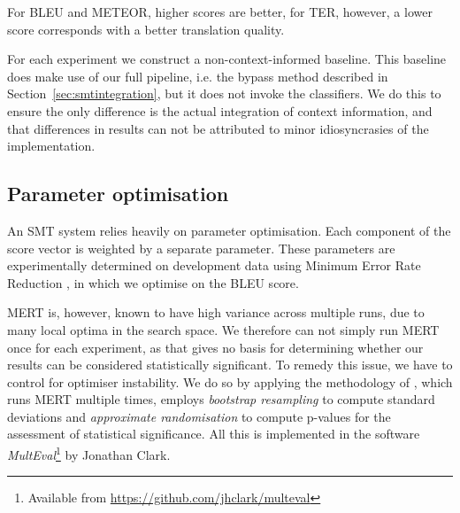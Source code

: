 For BLEU and METEOR, higher scores are better, for TER, however, a lower score
corresponds with a better translation quality.

For each experiment we construct a non-context-informed baseline. This
baseline does make use of our full pipeline, i.e. the bypass method described
in Section~\ref{sec:smtintegration}, but it does not invoke the
classifiers.  We do this to ensure the only difference is the actual
integration of context information, and that differences in results can not be
attributed to minor idiosyncrasies of the implementation.


\subsection{Parameter optimisation}
\label{sec:paropt}

An SMT system relies heavily on parameter optimisation. Each component of the
score vector is weighted by a separate parameter. These parameters are
experimentally determined on development data using Minimum Error Rate
Reduction \citep{MERT}, in which we optimise on the BLEU score. 


MERT is, however, known to have high variance across multiple runs, due to many
local optima in the search space. We therefore can not simply run MERT once for
each experiment, as that gives no basis for determining whether our results can
be considered statistically significant. To remedy this issue, we have to
control for optimiser instability. We do so by applying the methodology of
\cite{MERTCONTROL}, which runs MERT multiple times, employs \emph{bootstrap
resampling} to compute standard deviations and \emph{approximate randomisation}
to compute p-values for the assessment of statistical significance. All this is
implemented in the software \emph{MultEval}\footnote{Available from
\url{https://github.com/jhclark/multeval}} by Jonathan Clark.

